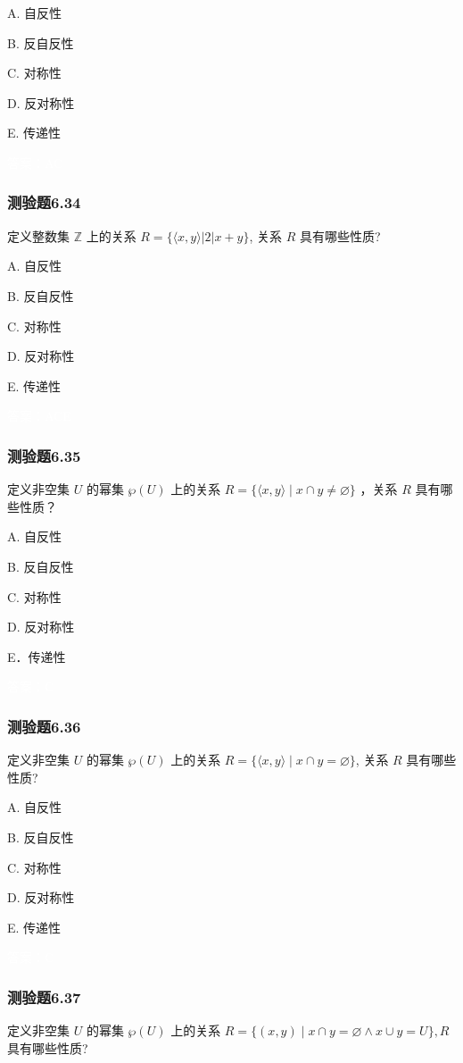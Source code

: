 \documentclass[UTF8, heading=true]{ctexart}
\begin{document}
A. 
自反性

B. 
反自反性

C. 
对称性

D. 
反对称性

E. 
传递性

\textcolor{white}{答案：AC}

\subsubsection{测验题6.34}

定义整数集 $\mathbb{Z}$ 上的关系 $R=\{\langle x, y\rangle|2| x+y\}$, 关系 $R$ 具有哪些性质?

A. 
自反性

B. 
反自反性

C. 
对称性

D. 
反对称性

E. 
传递性

\textcolor{white}{答案：ACE}

\subsubsection{测验题6.35}

定义非空集 $U$ 的幂集 $\wp(U)$ 上的关系 $R=\{\langle x, y\rangle \mid x \cap y \neq \varnothing\}$ ，关系 $R$ 具有哪些性质？

A. 自反性

B. 反自反性

C. 对称性

D.  反对称性

E．传递性

\textcolor{white}{答案：C}


\subsubsection{测验题6.36}
定义非空集 $U$ 的幂集 $\wp(U)$ 上的关系 $R=\{\langle x, y\rangle \mid x \cap y=\varnothing\}$, 关系 $R$ 具有哪些性质?

A. 
自反性

B. 
反自反性

C. 
对称性

D. 
反对称性

E. 
传递性

\textcolor{white}{答案：C}

\subsubsection{测验题6.37}
定义非空集 $U$ 的幂集 $\wp(U)$ 上的关系 $R=\{(x, y) \mid x \cap y=\varnothing \wedge x \cup y=U\}, R$ 具有哪些性质?
\end{document}
